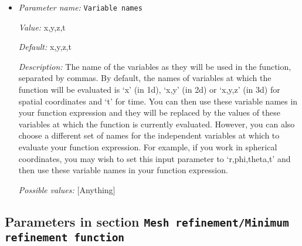 \begin{itemize}
{\it Description:} The formula that denotes the function you want to evaluate for particular values of the independent variables. This expression may contain any of the usual operations such as addition or multiplication, as well as all of the common functions such as `sin' or `cos'. In addition, it may contain expressions like `if(x>0, 1, -1)' where the expression evaluates to the second argument if the first argument is true, and to the third argument otherwise. For a full overview of possible expressions accepted see the documentation of the muparser library at http://muparser.beltoforion.de/.

If the function you are describing represents a vector-valued function with multiple components, then separate the expressions for individual components by a semicolon.


{\it Possible values:} [Anything]
\item {\it Parameter name:} {\tt Variable names}
\label{parameters:Mesh refinement/Maximum refinement function/Variable names}


{\it Value:} x,y,z,t


{\it Default:} x,y,z,t


{\it Description:} The name of the variables as they will be used in the function, separated by commas. By default, the names of variables at which the function will be evaluated is `x' (in 1d), `x,y' (in 2d) or `x,y,z' (in 3d) for spatial coordinates and `t' for time. You can then use these variable names in your function expression and they will be replaced by the values of these variables at which the function is currently evaluated. However, you can also choose a different set of names for the independent variables at which to evaluate your function expression. For example, if you work in spherical coordinates, you may wish to set this input parameter to `r,phi,theta,t' and then use these variable names in your function expression.


{\it Possible values:} [Anything]
\end{itemize}

\subsection{Parameters in section \tt Mesh refinement/Minimum refinement function}
\label{parameters:Mesh_20refinement/Minimum_20refinement_20function}

